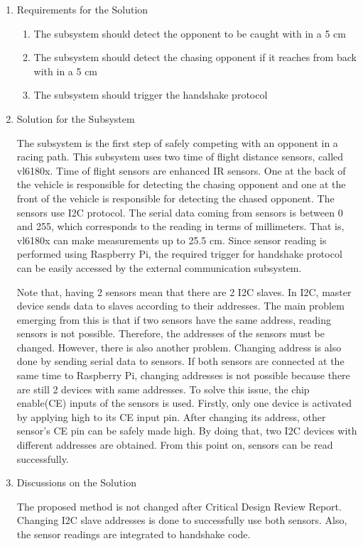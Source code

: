 \documentclass[a4paper,12pt]{article}
\begin{document}
\begin{enumerate}
	\item {Requirements for the Solution}
	
	\begin{enumerate}
		\item The subsystem should detect the opponent to be caught with in a 5 cm 
		\item The subsystem should detect the chasing opponent if it reaches from back with in a 5 cm 
		\item The subsystem should trigger the handshake protocol 
	\end{enumerate}
	
	\item {Solution for the Subsystem}
	
	The subsystem is the first step of safely competing with an opponent in a racing path. This subsystem uses two time of flight distance sensors, called vl6180x. Time of flight sensors are enhanced IR sensors. One at the back of the vehicle is responsible for detecting the chasing opponent and one at the front of the vehicle is responsible for detecting the chased opponent. The sensors use I2C protocol. The serial data coming from sensors is between 0 and 255, which corresponds to the reading in terms of millimeters. That is, vl6180x can make measurements up to 25.5 cm. Since sensor reading is performed using Raspberry Pi, the required trigger for handshake protocol can be easily accessed by the external communication subsystem.
	
	Note that, having 2 sensors mean that there are 2 I2C slaves. In I2C, master device sends data to slaves according to their addresses. The main problem emerging from this is that if two sensors have the same address, reading sensors is not possible. Therefore, the addresses of the sensors must be changed. However, there is also another problem. Changing address is also done by sending serial data to sensors. If both sensors are connected at the same time to Raspberry Pi, changing addresses is not possible because there are still 2 devices with same addresses. To solve this issue, the chip enable(CE) inputs of the sensors is used. Firstly, only one device is activated by applying high to its CE input pin. After changing its address, other sensor's CE pin can be safely made high. By doing that, two I2C devices with different addresses are obtained. From this point on, sensors can be read successfully.
	
	\item {Discussions on the Solution}
	
	The proposed method is not changed after Critical Design Review Report. Changing I2C slave addresses is done to successfully use both sensors. Also, the sensor readings are integrated to handshake code.
	
	
\end{enumerate}
\end{document}
